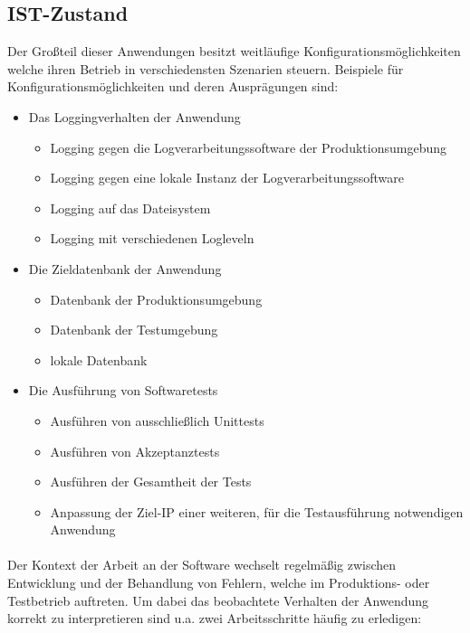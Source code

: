 \subsection{IST-Zustand}
Der Großteil dieser Anwendungen besitzt weitläufige Konfigurationsmöglichkeiten
welche ihren Betrieb in verschiedensten Szenarien steuern. Beispiele für
Konfigurationsmöglichkeiten und deren Ausprägungen sind:

\begin{itemize}
    \item Das Loggingverhalten der Anwendung
          \begin{itemize}
              \item Logging gegen die Logverarbeitungssoftware der Produktionsumgebung
              \item Logging gegen eine lokale Instanz der Logverarbeitungssoftware
              \item Logging auf das Dateisystem
              \item Logging mit verschiedenen Logleveln
          \end{itemize}
    \item Die Zieldatenbank der Anwendung \begin{itemize}
              \item Datenbank der Produktionsumgebung
              \item Datenbank der Testumgebung
              \item lokale Datenbank
          \end{itemize}
    \item Die Ausführung von Softwaretests \begin{itemize}
              \item Ausführen von ausschließlich Unittests
              \item Ausführen von Akzeptanztests
              \item Ausführen der Gesamtheit der Tests
              \item Anpassung der Ziel-IP einer weiteren, für die Testausführung
                    notwendigen Anwendung
          \end{itemize}
\end{itemize}

\paragraph{}
Der Kontext der Arbeit an der Software wechselt regelmäßig zwischen Entwicklung und
der Behandlung von Fehlern, welche im Produktions- oder Testbetrieb auftreten.
Um dabei das beobachtete Verhalten der Anwendung korrekt zu interpretieren sind
u.a. zwei Arbeitsschritte häufig zu erledigen:

